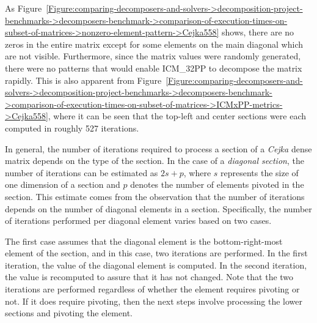 As Figure~\ref{Figure:comparing-decomposers-and-solvers->decomposition-project-benchmarks->decomposers-benchmark->comparison-of-execution-times-on-subset-of-matrices->nonzero-element-pattern->Cejka558} shows, there are no zeros in the entire matrix except for some elements on the main diagonal which are not visible.
Furthermore, since the matrix values were randomly generated, there were no patterns that would enable ICM\_32PP to decompose the matrix rapidly.
This is also apparent from Figure~\ref{Figure:comparing-decomposers-and-solvers->decomposition-project-benchmarks->decomposers-benchmark->comparison-of-execution-times-on-subset-of-matrices->ICMxPP-metrics->Cejka558}, where it can be seen that the top-left and center sections were each computed in roughly 527 iterations.

In general, the number of iterations required to process a section of a \textit{Cejka} dense matrix depends on the type of the section.
In the case of a \textit{diagonal section}, the number of iterations can be estimated as $2s + p$, where $s$ represents the size of one dimension of a section and $p$ denotes the number of elements pivoted in the section.
This estimate comes from the observation that the number of iterations depends on the number of diagonal elements in a section.
Specifically, the number of iterations performed per diagonal element varies based on two cases.

The first case assumes that the diagonal element is the bottom-right-most element of the section, and in this case, two iterations are performed.
In the first iteration, the value of the diagonal element is computed.
In the second iteration, the value is recomputed to assure that it has not changed.
Note that the two iterations are performed regardless of whether the element requires pivoting or not.
If it does require pivoting, then the next steps involve processing the lower sections and pivoting the element.

